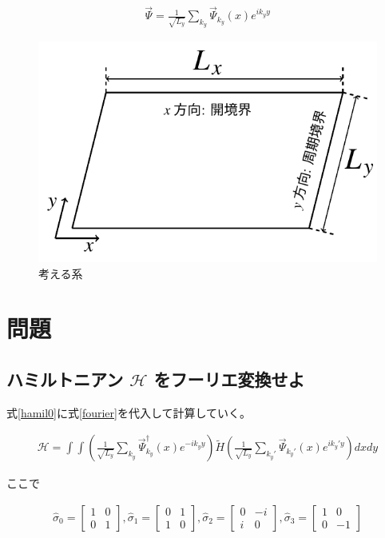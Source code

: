 \documentclass{jsarticle}
\begin{document}
		\begin{align}
			\vec{\Psi}=\frac{1}{\sqrt{L_y}}\sum_{k_y} \vec{\Psi}_{k_y}(x) e^{ik_yy}
			\label{fourier}
		\end{align}

		\begin{figure}[H]
			\centering
			\includegraphics[scale=1]{figure1}
			\caption{考える系}
			\label{system}
		\end{figure}

	\section{問題}
		\subsection{ハミルトニアン $\mathcal{H}$ をフーリエ変換せよ}
		式\eqref{hamil0}に式\eqref{fourier}を代入して計算していく。

		\begin{align}
			\mathcal{H}=\int \int \left( \frac{1}{\sqrt{L_y}}\sum_{k_y} \vec{\Psi}^\dagger _{k_y}(x) e^{-ik_yy} \right) \tilde{H} \left( \frac{1}{\sqrt{L_y}}\sum_{k_y'} \vec{\Psi}_{k_y'}(x) e^{ik_y'y} \right) dxdy
			\label{hamil1}
		\end{align}

		ここで

		\begin{align}
			\hat{\sigma}_0=
			\begin{bmatrix}
				1 & 0 \\
				0 & 1
			\end{bmatrix},
			\hat{\sigma}_1=
			\begin{bmatrix}
				0 & 1 \\
				1 & 0
			\end{bmatrix},
			\hat{\sigma}_2=
			\begin{bmatrix}
				0 & -i \\
				i & 0
			\end{bmatrix} ,
			\hat{\sigma}_3=
			\begin{bmatrix}
				1 & 0 \\
				0 & -1
			\end{bmatrix}
		\end{align}
\end{document}
